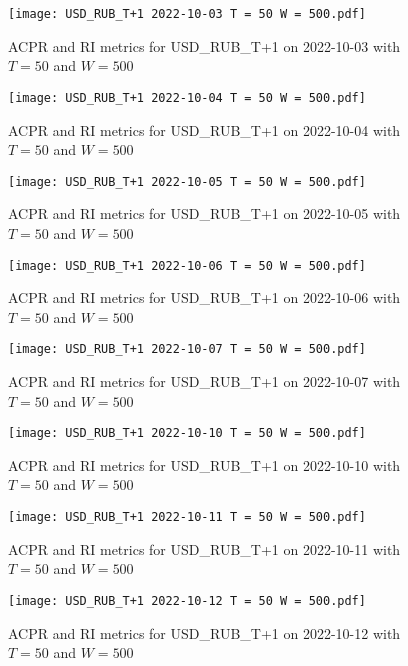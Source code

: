 \begin{figure}[htbp]
	\texttt{[image: USD\_RUB\_T+1 2022-10-03 T = 50 W = 500.pdf]}
	\caption{ACPR and RI metrics for USD\_RUB\_T+1 on 2022-10-03 with $T = 50$ and $W = 500$}
\end{figure}

\begin{figure}[htbp]
	\texttt{[image: USD\_RUB\_T+1 2022-10-04 T = 50 W = 500.pdf]}
	\caption{ACPR and RI metrics for USD\_RUB\_T+1 on 2022-10-04 with $T = 50$ and $W = 500$}
\end{figure}

\begin{figure}[htbp]
	\texttt{[image: USD\_RUB\_T+1 2022-10-05 T = 50 W = 500.pdf]}
	\caption{ACPR and RI metrics for USD\_RUB\_T+1 on 2022-10-05 with $T = 50$ and $W = 500$}
\end{figure}

\begin{figure}[htbp]
	\texttt{[image: USD\_RUB\_T+1 2022-10-06 T = 50 W = 500.pdf]}
	\caption{ACPR and RI metrics for USD\_RUB\_T+1 on 2022-10-06 with $T = 50$ and $W = 500$}
\end{figure}

\begin{figure}[htbp]
	\texttt{[image: USD\_RUB\_T+1 2022-10-07 T = 50 W = 500.pdf]}
	\caption{ACPR and RI metrics for USD\_RUB\_T+1 on 2022-10-07 with $T = 50$ and $W = 500$}
\end{figure}

\begin{figure}[htbp]
	\texttt{[image: USD\_RUB\_T+1 2022-10-10 T = 50 W = 500.pdf]}
	\caption{ACPR and RI metrics for USD\_RUB\_T+1 on 2022-10-10 with $T = 50$ and $W = 500$}
\end{figure}

\begin{figure}[htbp]
	\texttt{[image: USD\_RUB\_T+1 2022-10-11 T = 50 W = 500.pdf]}
	\caption{ACPR and RI metrics for USD\_RUB\_T+1 on 2022-10-11 with $T = 50$ and $W = 500$}
\end{figure}

\begin{figure}[htbp]
	\texttt{[image: USD\_RUB\_T+1 2022-10-12 T = 50 W = 500.pdf]}
	\caption{ACPR and RI metrics for USD\_RUB\_T+1 on 2022-10-12 with $T = 50$ and $W = 500$}
\end{figure}

